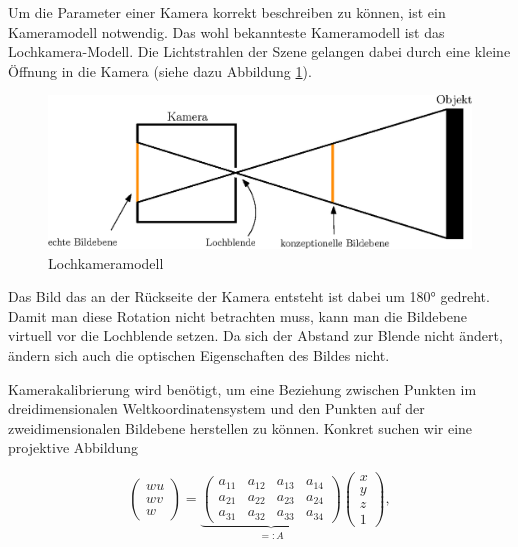 Um die Parameter einer Kamera korrekt beschreiben zu können, ist ein Kameramodell notwendig. Das wohl bekannteste Kameramodell ist das Lochkamera-Modell. Die Lichtstrahlen der Szene gelangen dabei durch eine kleine Öffnung in die Kamera (siehe dazu Abbildung \ref{fig:pinhole}).
\begin{figure}[!htb]
	\centering
	\includegraphics[scale=.8]{images/pinhole2.eps}
	\caption{Lochkameramodell}
	\label{fig:pinhole}
\end{figure}

Das Bild das an der Rückseite der Kamera entsteht ist dabei um 180° gedreht. Damit man diese Rotation nicht betrachten muss, kann man die Bildebene virtuell vor die Lochblende setzen. Da sich der Abstand zur Blende nicht ändert, ändern sich auch die optischen Eigenschaften des Bildes nicht.

Kamerakalibrierung wird benötigt, um eine Beziehung zwischen Punkten im dreidimensionalen Weltkoordinatensystem und den Punkten auf der zweidimensionalen Bildebene herstellen zu können. Konkret suchen wir eine projektive Abbildung

\begin{equation}\label{eq:projectionMat}
	\begin{pmatrix}
	wu \\wv \\w
	\end{pmatrix} =
		\underbrace{\begin{pmatrix}
		a_{11} & a_{12} & a_{13} & a_{14} \\
		a_{21} & a_{22} & a_{23} & a_{24} \\
		a_{31} & a_{32} & a_{33} & a_{34}
		\end{pmatrix}}_{=:A}	\begin{pmatrix}
		x \\y \\z \\ 1
		\end{pmatrix},
\end{equation}


